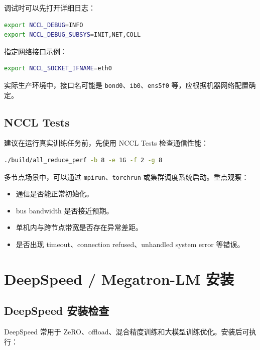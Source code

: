 调试时可以先打开详细日志：

\begin{lstlisting}[language=bash,caption={NCCL 调试日志},label={lst:nccl-debug-env}]
export NCCL_DEBUG=INFO
export NCCL_DEBUG_SUBSYS=INIT,NET,COLL
\end{lstlisting}

指定网络接口示例：

\begin{lstlisting}[language=bash,caption={指定 NCCL 网络接口},label={lst:nccl-ifname}]
export NCCL_SOCKET_IFNAME=eth0
\end{lstlisting}

实际生产环境中，接口名可能是 \texttt{bond0}、\texttt{ib0}、\texttt{ens5f0} 等，应根据机器网络配置确定。

\subsection{NCCL Tests}

建议在运行真实训练任务前，先使用 NCCL Tests 检查通信性能：

\begin{lstlisting}[language=bash,caption={NCCL all_reduce 性能测试示例},label={lst:nccl-tests}]
./build/all_reduce_perf -b 8 -e 1G -f 2 -g 8
\end{lstlisting}

多节点场景中，可以通过 \texttt{mpirun}、\texttt{torchrun} 或集群调度系统启动。重点观察：

\begin{itemize}
\item 通信是否能正常初始化。
\item bus bandwidth 是否接近预期。
\item 单机内与跨节点带宽是否存在异常差距。
\item 是否出现 timeout、connection refused、unhandled system error 等错误。
\end{itemize}

\section{DeepSpeed / Megatron-LM 安装}

\subsection{DeepSpeed 安装检查}

DeepSpeed 常用于 ZeRO、offload、混合精度训练和大模型训练优化。安装后可执行：


